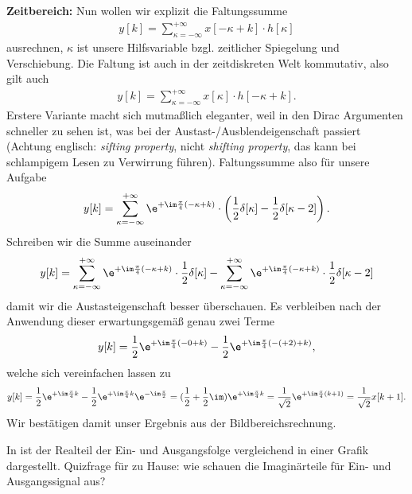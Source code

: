 \begin{ExCalc}
\textbf{Zeitbereich:}
Nun wollen wir explizit die Faltungssumme
\begin{align}
y[k] = \sum_{\kappa=-\infty}^{+\infty} x[-\kappa + k] \cdot h[\kappa]
\end{align}
ausrechnen, $\kappa$ ist unsere Hilfsvariable bzgl. zeitlicher Spiegelung und
Verschiebung.
%
Die Faltung ist auch in der zeitdiskreten Welt kommutativ, also gilt auch
\begin{align}
y[k] = \sum_{\kappa=-\infty}^{+\infty} x[\kappa] \cdot h[-\kappa + k].
\end{align}
%
Erstere Variante macht sich mutmaßlich eleganter, weil in den Dirac Argumenten
schneller zu sehen ist, was bei der Austast-/Ausblendeigenschaft passiert
(Achtung englisch:
\textit{sifting property}, nicht \textit{shifting property}, das kann bei schlampigem
Lesen zu Verwirrung führen).
%
Faltungssumme also für unsere Aufgabe
%
\begin{align}
y[k] = \sum_{\kappa=-\infty}^{+\infty} \e^{+\im\frac{\pi}{4} (-\kappa+k)} \cdot
\left(\frac{1}{2}\delta[\kappa] - \frac{1}{2}\delta[\kappa-2]\right).
\end{align}
%
Schreiben wir die Summe auseinander
\begin{align}
y[k] =
\sum_{\kappa=-\infty}^{+\infty} \e^{+\im\frac{\pi}{4} (-\kappa+k)} \cdot \frac{1}{2}\delta[\kappa]
-
\sum_{\kappa=-\infty}^{+\infty} \e^{+\im\frac{\pi}{4} (-\kappa+k)} \cdot \frac{1}{2}\delta[\kappa-2]
\end{align}
damit wir die Austasteigenschaft besser überschauen.
%
Es verbleiben nach der Anwendung dieser erwartungsgemäß genau zwei Terme
\begin{align}
y[k] =
\frac{1}{2} \e^{+\im\frac{\pi}{4} (-0+k)}
-
\frac{1}{2} \e^{+\im\frac{\pi}{4} (-(+2)+k)},
\end{align}
welche sich vereinfachen lassen zu
\begin{align}
y[k] =
\frac{1}{2} \e^{+\im\frac{\pi}{4} k}
-
\frac{1}{2} \e^{+\im\frac{\pi}{4} k} \e^{-\im\frac{\pi}{2}} =
(\frac{1}{2} + \frac{1}{2} \im )\e^{+\im\frac{\pi}{4} k}
=
\frac{1}{\sqrt{2}} \e^{+\im \frac{\pi}{4} (k+1)}=
\frac{1}{\sqrt{2}} x[k+1].
\end{align}
Wir bestätigen damit unser Ergebnis aus der Bildbereichsrechnung.

In  ist der Realteil der Ein- und Ausgangsfolge vergleichend
in einer Grafik dargestellt. Quizfrage für zu Hause: wie schauen die Imaginärteile
für Ein- und Ausgangssignal aus?
\end{ExCalc}
